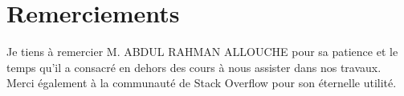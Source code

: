 \section*{Remerciements}

Je tiens à remercier
M. ABDUL RAHMAN ALLOUCHE pour sa patience et le temps qu'il a consacré en dehors des cours à nous assister dans nos travaux.\\
Merci également à la communauté de Stack Overflow pour son éternelle utilité.
